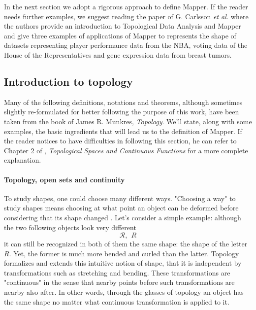 In the next section we adopt a rigorous approach to define Mapper. If the reader needs further examples, we suggest reading the paper of G. Carlsson \textit{et al.} \cite{extracting_insights} where the authors provide an introduction to Topological Data Analysis and Mapper and give three examples of applications of Mapper to represents the shape of datasets representing player performance data from the NBA, voting data of the House of the Representatives and gene expression data from breast tumors. 

\subsection{Introduction to topology}
Many of the following definitions, notations and theorems, although sometimes slightly re-formulated for better following the purpose of this work, have been taken from the book of James R. Munkres, \textit{Topology}\cite{Munkres}. We'll state, along with some examples, the basic ingredients that will lead us to the definition of Mapper. If the reader notices to have difficulties in following this section, he can refer to Chapter 2 of \cite{Munkres}, \textit{Topological Spaces and Continuous Functions} for a more complete explanation.

\paragraph{Topology, open sets and continuity}
To study shapes, one could choose many different ways. "Choosing a way" to study shapes means choosing at what point an object can be deformed before considering that its shape changed  \cite{what_is_topology}. Let's consider a simple example: although the two following objects look very different $$\mathcal{R},\ \ R$$ it can still be recognized in both of them the same shape: the shape of the letter $R$. Yet, the former is much more bended and curled than the latter. Topology formalizes and extends this intuitive notion of shape, that it is independent by transformations such as stretching and bending. These transformations are "continuous" in the sense that nearby points before such transformations are nearby also after. In other words, through the glasses of topology an object has the same shape no matter what continuous transformation is applied to it.

